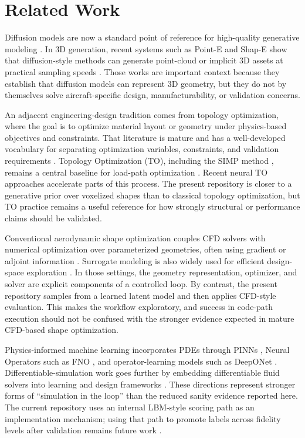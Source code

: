 \section{Related Work}
\label{sec:related_work}
Diffusion models are now a standard point of reference for high-quality generative modeling \cite{ho2020denoising, nichol2021improved}. In 3D generation, recent systems such as Point-E and Shap-E show that diffusion-style methods can generate point-cloud or implicit 3D assets at practical sampling speeds \cite{nichol2022pointe, jun2023shape}. Those works are important context because they establish that diffusion models can represent 3D geometry, but they do not by themselves solve aircraft-specific design, manufacturability, or validation concerns.

An adjacent engineering-design tradition comes from topology optimization, where the goal is to optimize material layout or geometry under physics-based objectives and constraints. That literature is mature and has a well-developed vocabulary for separating optimization variables, constraints, and validation requirements \cite{wu2021topology_review}. Topology Optimization (TO), including the SIMP method \cite{sigmund2001topology}, remains a central baseline for load-path optimization \cite{sigmund2013topology}. Recent neural TO approaches \cite{sosnovik2019neural} accelerate parts of this process. The present repository is closer to a generative prior over voxelized shapes than to classical topology optimization, but TO practice remains a useful reference for how strongly structural or performance claims should be validated.

Conventional aerodynamic shape optimization couples CFD solvers with numerical optimization over parameterized geometries, often using gradient or adjoint information \cite{jameson1988aerodynamic, jameson1995optimum, elham2021openfemflow}. Surrogate modeling is also widely used for efficient design-space exploration \cite{forrester2008engineering, andres2021surrogate_aero}. In those settings, the geometry representation, optimizer, and solver are explicit components of a controlled loop. By contrast, the present repository samples from a learned latent model and then applies CFD-style evaluation. This makes the workflow exploratory, and success in code-path execution should not be confused with the stronger evidence expected in mature CFD-based shape optimization.

Physics-informed machine learning incorporates PDEs through PINNs \cite{raissi2019pinn}, Neural Operators such as FNO \cite{li2020fourier}, and operator-learning models such as DeepONet \cite{lu2021deeponet}. Differentiable-simulation work goes further by embedding differentiable fluid solvers into learning and design frameworks \cite{li2024neuralfluid}. These directions represent stronger forms of ``simulation in the loop'' than the reduced sanity evidence reported here. The current repository uses an internal LBM-style scoring path as an implementation mechanism; using that path to promote labels across fidelity levels after validation remains future work \cite{vinuesa2022enhancing}.

